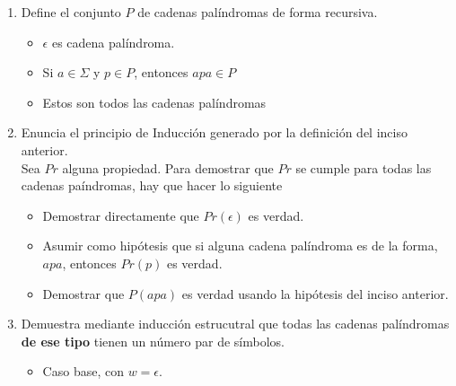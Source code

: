 \documentclass{article}
\begin{document}
\begin{enumerate}
{            \begin{enumerate}
                \item {
                    Define el conjunto $P$ de cadenas palíndromas de forma 
                    recursiva.
                    \begin{itemize}
                        \item {
                            $\epsilon$ es cadena palíndroma.
                        }
                        \item {
                            Si $a \in \Sigma$ y $p \in P$, entonces $apa \in P$
                        }
                        \item {
                            Estos son todos las cadenas palíndromas 
                        }
                    \end{itemize}
                }
                \item {
                    Enuncia el principio de Inducción generado por la definición
                    del inciso anterior.\\
                    Sea $Pr$ alguna propiedad. Para demostrar que $Pr$ se cumple
                    para todas las cadenas paíndromas, hay que hacer lo siguiente
                    \begin{itemize}
                        \item {
                            Demostrar directamente que $Pr(\epsilon)$ es verdad.
                        }
                        \item {
                            Asumir como hipótesis que si alguna cadena 
                            palíndroma es de la forma, $apa$, entonces $Pr(p)$ es verdad.
                        }
                        \item {
                            Demostrar que $P(apa)$ es verdad usando la 
                            hipótesis del inciso anterior.
                        }
                    \end{itemize}
                }
                \item {
                    Demuestra mediante inducción estrucutral que todas las 
                    cadenas palíndromas \textbf{de ese tipo} tienen un número 
                    par de símbolos.
                    \begin{itemize}
                        \item {
                            Caso base, con $w = \epsilon$.\\
}
\end{itemize}}
\end{enumerate}}
\end{enumerate}
\end{document}
